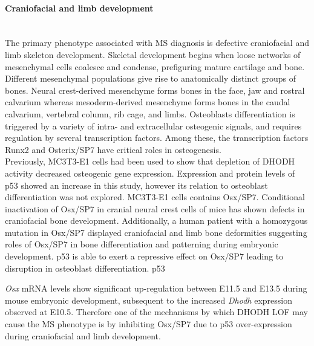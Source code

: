\documentclass[12pt]{article}
\begin{document}
\paragraph{Craniofacial and limb development}
 ~\\The primary phenotype associated with MS diagnosis is defective craniofacial and limb skeleton development. Skeletal development begins when loose networks of mesenchymal cells coalesce and condense, prefiguring mature cartilage and bone. Different mesenchymal populations give rise to anatomically distinct groups of bones. Neural crest-derived mesenchyme forms bones in the face, jaw and rostral calvarium whereas mesoderm-derived mesenchyme forms bones in the caudal calvarium, vertebral column, rib cage, and limbs. Osteoblasts differentiation is triggered by a variety of intra- and extracellular osteogenic signals, and  requires regulation by several transcription factors. Among these, the transcription factors Runx2 and Osterix/SP7 have critical roles in osteogenesis. 
~\\Previously, MC3T3-E1 cells had been used to show that depletion of DHODH activity decreased osteogenic gene expression. Expression and protein levels of p53 showed an increase in this study, however its relation to osteoblast differentiation was not explored. MC3T3-E1 cells contains Osx/SP7. Conditional inactivation of Osx/SP7 in cranial neural crest cells of mice has shown defects in craniofacial bone development. Additionally, a human patient with a homozygous mutation in Osx/SP7 displayed craniofacial and limb bone deformities suggesting roles of Osx/SP7 in bone differentiation and patterning during embryonic development. p53 is able to exert a repressive effect on Osx/SP7 leading to disruption in osteoblast differentiation. p53 

\textit{Osx} mRNA levels show significant up-regulation between E11.5 and E13.5 during mouse embryonic development, subsequent to the increased \textit{Dhodh} expression observed at E10.5. Therefore one of the mechanisms by which DHODH LOF may cause the MS phenotype is by inhibiting  Osx/SP7  due to p53 over-expression during craniofacial and limb development.
\end{document}
